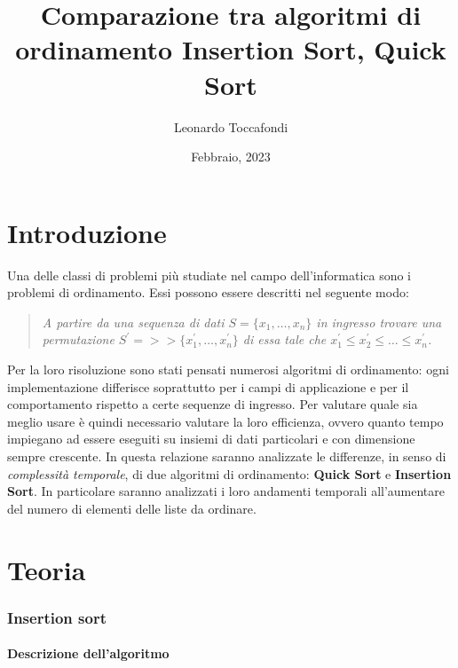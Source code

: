 \documentclass[
]{article}
\title{Comparazione tra algoritmi di ordinamento Insertion Sort, Quick
Sort}
\author{Leonardo Toccafondi}
\date{Febbraio, 2023}
\begin{document}
\maketitle

\hypertarget{introduzione}{%
\section{Introduzione}\label{introduzione}}

Una delle classi di problemi più studiate nel campo dell'informatica
sono i problemi di ordinamento. Essi possono essere descritti nel
seguente modo:

\begin{quote}
\emph{A partire da una sequenza di dati \(S = \{x_1, \dotsc, x_n\}\) in
ingresso trovare una permutazione
\(S^{\prime} = > > \{x_1^{\prime}, \dotsc , x_n^{\prime}\}\) di essa
tale che
\(x_1^{\prime} \leq x_2^{\prime} \leq \dotsc \leq x_n^\prime\).}
\end{quote}

Per la loro risoluzione sono stati pensati numerosi algoritmi di
ordinamento: ogni implementazione differisce soprattutto per i campi di
applicazione e per il comportamento rispetto a certe sequenze di
ingresso. Per valutare quale sia meglio usare è quindi necessario
valutare la loro efficienza, ovvero quanto tempo impiegano ad essere
eseguiti su insiemi di dati particolari e con dimensione sempre
crescente. In questa relazione saranno analizzate le differenze, in
senso di \emph{complessità temporale}, di due algoritmi di ordinamento:
\textbf{Quick Sort} e \textbf{Insertion Sort}. In particolare saranno
analizzati i loro andamenti temporali all'aumentare del numero di
elementi delle liste da ordinare.

\hypertarget{teoria}{%
\section{Teoria}\label{teoria}}

\hypertarget{insertion-sort}{%
\subsubsection{Insertion sort}\label{insertion-sort}}

\hypertarget{descrizione-dellalgoritmo}{%
\paragraph{Descrizione dell'algoritmo}\label{descrizione-dellalgoritmo}}
\end{document}
